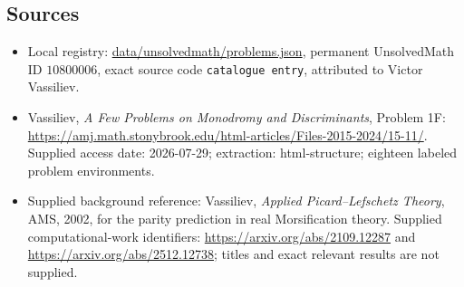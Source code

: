 \documentclass[11pt]{article}
\begin{document}
\subsection{Sources}
\begin{itemize}
\item Local registry: \url{data/unsolvedmath/problems.json}, permanent UnsolvedMath ID $10800006$, exact source code \texttt{catalogue entry}, attributed to Victor Vassiliev.
\item Vassiliev, \emph{A Few Problems on Monodromy and Discriminants}, Problem 1F: \url{https://amj.math.stonybrook.edu/html-articles/Files-2015-2024/15-11/}. Supplied access date: 2026-07-29; extraction: html-structure; eighteen labeled problem environments.
\item Supplied background reference: Vassiliev, \emph{Applied Picard--Lefschetz Theory}, AMS, 2002, for the parity prediction in real Morsification theory. Supplied computational-work identifiers: \url{https://arxiv.org/abs/2109.12287} and \url{https://arxiv.org/abs/2512.12738}; titles and exact relevant results are not supplied.
\end{itemize}
\end{document}
